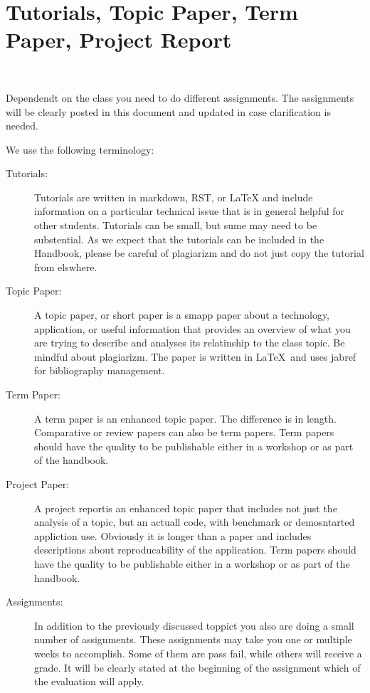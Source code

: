 
\section{Tutorials, Topic Paper, Term Paper, Project Report}

\FILENAME\

Dependendt on the class you need to do different assignments. The
assignments will be clearly posted in this document and updated in
case clarification is needed. 

We use the following terminology:

\begin{description}

\item[Tutorials:] Tutorials are written in markdown, RST, or LaTeX and
  include information on a particular technical issue that is in
  general helpful for other students. Tutorials can be small, but sume
  may need to be substential. As we expect that the tutorials can be
  included in the Handbook, please be careful of plagiarizm and do not
  just copy the tutorial from elswhere. 

\item[Topic Paper:] A topic paper, or short paper is a smapp paper
  about a technology, application, or useful information that provides
  an overview of what you are trying to describe and analyses its
  relatinship to the class topic. Be mindful about plagiarizm. The
  paper is written in \LaTeX~and uses jabref for bibliography management.

\item[Term Paper:] A term paper is an enhanced topic paper. The
  difference is in length. Comparative or review papers can also be
  term papers.  Term papers should have the quality to be publishable
  either in a workshop or as part of the handbook.

\item[Project Paper:] A project reportis an enhanced topic paper that
  includes not just the analysis of a topic, but an actuall code, with
  benchmark or demosntarted appliction use. Obviously it is longer
  than a paper and includes descriptions about reproducability of the
  application. Term papers should have the quality to be publishable
  either in a workshop or as part of the handbook.

\item[Assignments:] In addition to the previously discussed toppict
  you also are doing a small number of assignments. These assignments
  may take you one or multiple weeks to accomplish. Some of them are
  pass fail, while others will receive a grade. It will be clearly
  stated at the beginning of the assignment which of the evaluation
  will apply.

\end{description}

